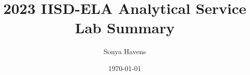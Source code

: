\title{\flushleft\vpace{-2.0cm} 2023 IISD-ELA Analytical Service Lab Summary}
\author{Sonya Havens}
\date{\today}

\usepackage{wrapfig}
\usepackage{graphicx}
\usepackage{subcaption}
\usepackage[font=footnotesize]{caption}
\usepackage{booktabs}
\usepackage{titling}
\captionsetup[figure]{font=footnotesize}
